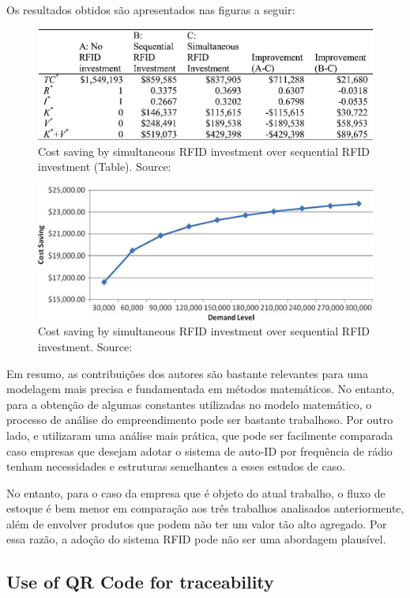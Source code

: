 Os resultados obtidos são apresentados nas figuras a seguir:

\begin{figure}[h!]
\centering
\includegraphics[width=.65\linewidth]{images/Development/chap3/table.png}
\caption{Cost saving by simultaneous RFID investment over sequential RFID investment (Table). Source: \cite{Lee2012}}
\label{fig:Lee_results_table}
\end{figure}

\begin{figure}[h!]
\centering
\includegraphics[width=.65\linewidth]{images/Development/chap3/chart.png}
\caption{Cost saving by simultaneous RFID investment over sequential RFID investment. Source: \cite{Lee2012}}
\label{fig:Lee_results}
\end{figure}

Em resumo, as contribuições dos autores \textcite{Lee2012} são bastante relevantes para uma modelagem mais precisa e fundamentada em métodos matemáticos. No entanto, para a obtenção de algumas constantes utilizadas no modelo matemático, o processo de análise do empreendimento pode ser bastante trabalhoso. Por outro lado, \textcite{Yue2011} e \textcite{Ustundag2007} utilizaram uma análise mais prática, que pode ser facilmente comparada caso empresas que desejam adotar o sistema de auto-ID por frequência de rádio tenham necessidades e estruturas semelhantes a esses estudos de caso.

No entanto, para o caso da empresa que é objeto do atual trabalho, o fluxo de estoque é bem menor em comparação aos três trabalhos analisados anteriormente, além de envolver produtos que podem não ter um valor tão alto agregado. Por essa razão, a adoção do sistema RFID pode não ser uma abordagem plausível.

\subsection{Use of QR Code for traceability}\label{QRtraceability}

